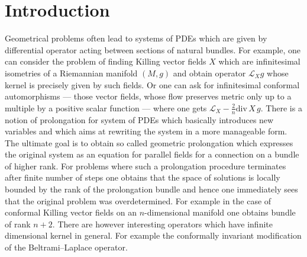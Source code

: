 \documentclass[12pt,a4paper,final]{report}
\begin{document}



\hypersetup{unicode}
\hypersetup{breaklinks=true}



\chapter*{Introduction}

Geometrical problems often lead to systems of PDEs which are given by differential operator acting between sections of natural bundles. For example, one can consider the problem of finding Killing vector fields $X$ which are infinitesimal isometries of a Riemannian manifold $(M, g)$ and obtain operator $\mathcal{L}_X g$ whose kernel is precisely given by such fields. Or one can ask for infinitesimal conformal automorphisms --- those vector fields, whose flow preserves metric only up to a multiple by a positive scalar function --- where one gets $\mathcal{L}_X - \frac{2}{n} \mathrm{div}\, X \, g.$ There is a notion of prolongation for system of PDEs which basically introduces new variables and which aims at rewriting the system in a more manageable form. The ultimate goal is to obtain so called geometric prolongation which expresses the original system as an equation for parallel fields for a connection on a bundle of higher rank. For problems where such a prolongation procedure terminates after finite number of steps one obtains that the space of solutions is locally bounded by the rank of the prolongation bundle and hence one immediately sees that the original problem was overdetermined. For example in the case of conformal Killing vector fields on an $n$-dimensional manifold one obtains bundle of rank $n+2.$ There are however interesting operators which have infinite dimensional kernel in general. For example the conformally invariant  modification of the Beltrami--Laplace operator.
\end{document}
